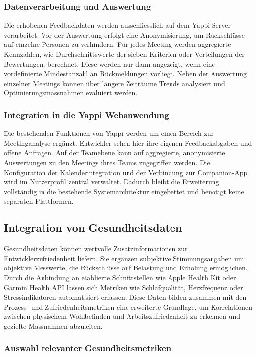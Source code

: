 \documentclass[12pt,a4paper]{report}
\begin{document}
\subsubsection{Datenverarbeitung und Auswertung}

Die erhobenen Feedbackdaten werden ausschliesslich auf dem Yappi-Server verarbeitet.
Vor der Auswertung erfolgt eine Anonymisierung, um Rückschlüsse auf einzelne Personen zu verhindern.
Für jedes Meeting werden aggregierte Kennzahlen, wie Durchschnittswerte der sieben Kriterien oder Verteilungen der Bewertungen, berechnet.
Diese werden nur dann angezeigt, wenn eine vordefinierte Mindestanzahl an Rückmeldungen vorliegt.
Neben der Auswertung einzelner Meetings können über längere Zeiträume Trends analysiert und Optimierungsmassnahmen evaluiert werden.

\subsubsection{Integration in die Yappi Webanwendung}

Die bestehenden Funktionen von Yappi werden um einen Bereich zur Meetinganalyse ergänzt.
Entwickler sehen hier ihre eigenen Feedbackabgaben und offene Anfragen.
Auf der Teamebene kann auf aggregierte, anonymisierte Auswertungen zu den Meetings ihres Teams zugegriffen werden.
Die Konfiguration der Kalenderintegration und der Verbindung zur Companion-App wird im Nutzerprofil zentral verwaltet.
Dadurch bleibt die Erweiterung vollständig in die bestehende Systemarchitektur eingebettet und benötigt keine separaten Plattformen.

\subsection{Integration von Gesundheitsdaten}

Gesundheitsdaten können wertvolle Zusatzinformationen zur Entwicklerzufriedenheit liefern. Sie ergänzen subjektive Stimmungsangaben
um objektive Messwerte, die Rückschlüsse auf Belastung und Erholung ermöglichen. Durch die Anbindung an etablierte Schnittstellen
wie Apple Health Kit oder Garmin Health API lassen sich Metriken wie Schlafqualität, Herzfrequenz oder Stressindikatoren 
automatisiert erfassen. Diese Daten bilden zusammen mit den Prozess- und Zufriedenheitsmetriken eine erweiterte Grundlage, um
Korrelationen zwischen physischem Wohlbefinden und Arbeitszufriedenheit zu erkennen und gezielte Massnahmen abzuleiten.

\subsubsection{Auswahl relevanter Gesundheitsmetriken}
\end{document}
